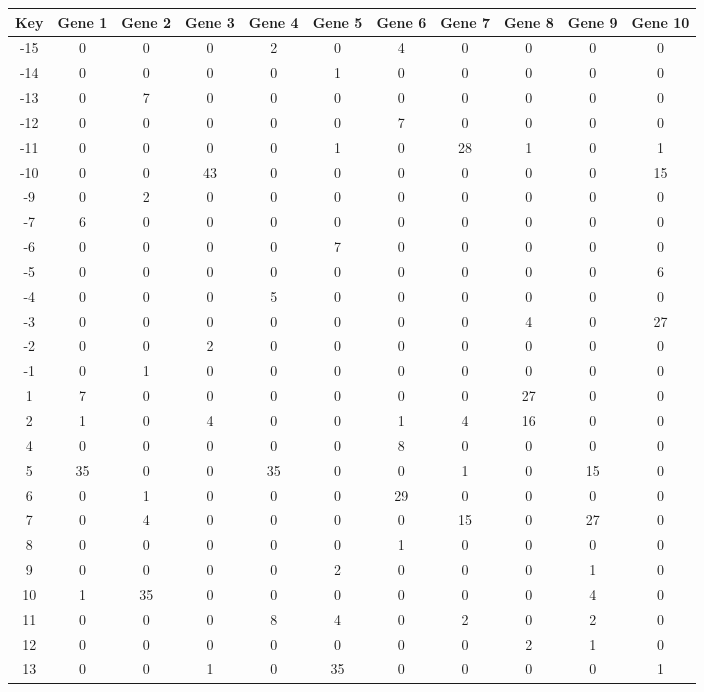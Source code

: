 \begin{tabular}{|c|c|c|c|c|c|c|c|c|c|c|}
\hline
Key & Gene 1 & Gene 2 & Gene 3 & Gene 4 & Gene 5 & Gene 6 & Gene 7 & Gene 8 & Gene 9 & Gene 10 \\
\hline
-15 & 0 & 0 & 0 & 2 & 0 & 4 & 0 & 0 & 0 & 0 \\
-14 & 0 & 0 & 0 & 0 & 1 & 0 & 0 & 0 & 0 & 0 \\
-13 & 0 & 7 & 0 & 0 & 0 & 0 & 0 & 0 & 0 & 0 \\
-12 & 0 & 0 & 0 & 0 & 0 & 7 & 0 & 0 & 0 & 0 \\
-11 & 0 & 0 & 0 & 0 & 1 & 0 & 28 & 1 & 0 & 1 \\
-10 & 0 & 0 & 43 & 0 & 0 & 0 & 0 & 0 & 0 & 15 \\
-9 & 0 & 2 & 0 & 0 & 0 & 0 & 0 & 0 & 0 & 0 \\
-7 & 6 & 0 & 0 & 0 & 0 & 0 & 0 & 0 & 0 & 0 \\
-6 & 0 & 0 & 0 & 0 & 7 & 0 & 0 & 0 & 0 & 0 \\
-5 & 0 & 0 & 0 & 0 & 0 & 0 & 0 & 0 & 0 & 6 \\
-4 & 0 & 0 & 0 & 5 & 0 & 0 & 0 & 0 & 0 & 0 \\
-3 & 0 & 0 & 0 & 0 & 0 & 0 & 0 & 4 & 0 & 27 \\
-2 & 0 & 0 & 2 & 0 & 0 & 0 & 0 & 0 & 0 & 0 \\
-1 & 0 & 1 & 0 & 0 & 0 & 0 & 0 & 0 & 0 & 0 \\
1 & 7 & 0 & 0 & 0 & 0 & 0 & 0 & 27 & 0 & 0 \\
2 & 1 & 0 & 4 & 0 & 0 & 1 & 4 & 16 & 0 & 0 \\
4 & 0 & 0 & 0 & 0 & 0 & 8 & 0 & 0 & 0 & 0 \\
5 & 35 & 0 & 0 & 35 & 0 & 0 & 1 & 0 & 15 & 0 \\
6 & 0 & 1 & 0 & 0 & 0 & 29 & 0 & 0 & 0 & 0 \\
7 & 0 & 4 & 0 & 0 & 0 & 0 & 15 & 0 & 27 & 0 \\
8 & 0 & 0 & 0 & 0 & 0 & 1 & 0 & 0 & 0 & 0 \\
9 & 0 & 0 & 0 & 0 & 2 & 0 & 0 & 0 & 1 & 0 \\
10 & 1 & 35 & 0 & 0 & 0 & 0 & 0 & 0 & 4 & 0 \\
11 & 0 & 0 & 0 & 8 & 4 & 0 & 2 & 0 & 2 & 0 \\
12 & 0 & 0 & 0 & 0 & 0 & 0 & 0 & 2 & 1 & 0 \\
13 & 0 & 0 & 1 & 0 & 35 & 0 & 0 & 0 & 0 & 1 \\
\hline
\end{tabular}
